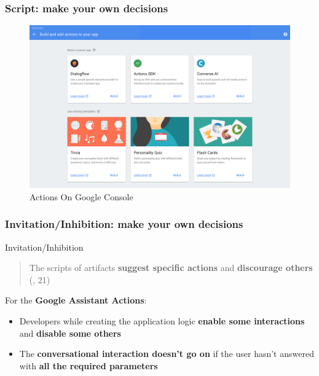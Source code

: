 \documentclass{beamer}
\begin{document}
\begin{frame}
\frametitle{Script: make your own decisions}
\begin{figure}
	\centering
	\includegraphics[width=1\linewidth]{images/script_image}
	\caption[actions_google]{Actions On Google Console}
	\label{fig:scriptimage}
\end{figure}

\end{frame}

\begin{frame}
\frametitle{Invitation/Inhibition: make your own decisions}

\begin{block}{Invitation/Inhibition} 
	\begin{quote}
		The scripts of artifacts \textbf{suggest specific actions} and \textbf{discourage others} (\cite{verbeek2011moralizing}, 21)
	\end{quote}
\vspace{0.5cm}
For the \textbf{Google Assistant Actions}:
\begin{itemize}
	\item Developers while creating the application logic \textbf{enable some interactions} and \textbf{disable some others}
	\item The \textbf{conversational interaction doesn't go on} if the user hasn't answered with \textbf{all the required parameters}
\end{itemize}

\end{block}

\end{frame}
\end{document}
